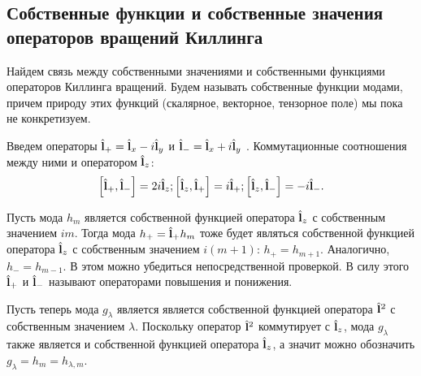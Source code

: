 \documentclass[12pt,a4paper]{article}
\begin{document}
        \subsection{Собственные функции и собственные значения операторов вращений Киллинга}

            Найдем связь между собственными значениями и собственными функциями операторов Киллинга вращений. Будем называть собственные функции модами, причем природу этих функций (скалярное, векторное, тензорное поле) мы пока не конкретизуем.

            Введем операторы $\hat{\mathbf{l}}_{+} = \hat{\mathbf{l}}_x - i\hat{\mathbf{l}}_y$ и $\hat{\mathbf{l}}_{-} = \hat{\mathbf{l}}_x + i\hat{\mathbf{l}}_y$ \cite{burlankov_space_dynamics,burlankov_tmf}. Коммутационные соотношения между ними и оператором $\hat{\mathbf{l}}_z$:
            \begin{equation}
                \left[ \hat{\mathbf{l}}_{+}, \hat{\mathbf{l}}_{-} \right] = 2 i \hat{\mathbf{l}}_{z} ;
                \left[ \hat{\mathbf{l}}_{z}, \hat{\mathbf{l}}_{+} \right] =   i \hat{\mathbf{l}}_{+} ;
                \left[ \hat{\mathbf{l}}_{z}, \hat{\mathbf{l}}_{-} \right] = - i \hat{\mathbf{l}}_{-} .
            \end{equation}

            Пусть мода $h_m$ является собственной функцией оператора $\hat{\mathbf{l}}_z$ с собственным значением $i m$. Тогда мода $h_{+} = \hat{\mathbf{l}}_{+} h_m$ тоже будет являться собственной функцией оператора $\hat{\mathbf{l}}_z$ с собственным значением $i (m + 1)$: $h_{+} = h_{m + 1}$. Аналогично, $h_{-} = h_{m - 1}$. В этом можно убедиться непосредственной проверкой. В силу этого $\hat{\mathbf{l}}_{+}$ и $\hat{\mathbf{l}}_{-}$ называют операторами повышения и понижения.

            Пусть теперь мода $g_\lambda$ является является собственной функцией оператора $\hat{\mathbf{l}}^2$ с собственным значением $\lambda$. Поскольку оператор $\hat{\mathbf{l}}^2$ коммутирует с $\hat{\mathbf{l}}_z$, мода $g_\lambda$ также является и собственной функцией оператора $\hat{\mathbf{l}}_z$, а значит можно обозначить $g_\lambda = h_m = h_{\lambda,m}$.
\end{document}
